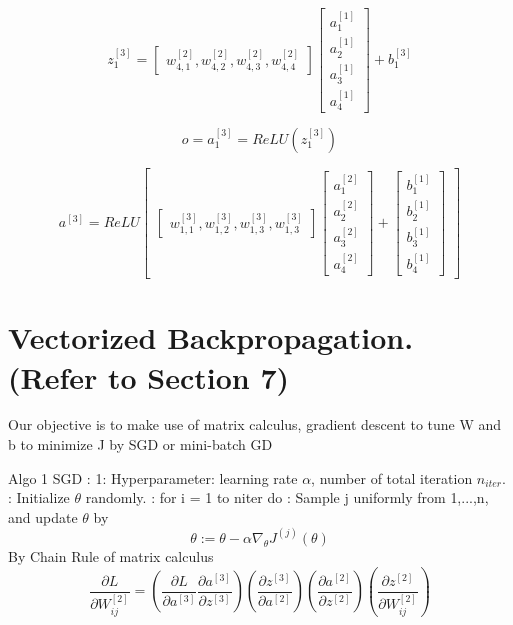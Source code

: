 \documentclass{article}
\begin{document}
\[
z_1^{[3]}=
\begin{bmatrix}
w_{4,1}^{[2]},w_{4,2}^{[2]},w_{4,3}^{[2]},w_{4,4}^{[2]}
\end{bmatrix}
\begin{bmatrix}
a_1^{[1]} \\ a_2^{[1]} \\ a_3^{[1]} \\ a_4^{[1]}
\end{bmatrix}
+ b_1^{[3]}
\]

\[ o = a_1^{[3]} = ReLU( z_1^{[3]}) \]

\[a^{[3]} = ReLU 
\begin{bmatrix}
\begin{bmatrix}
w_{1,1}^{[3]},w_{1,2}^{[3]},w_{1,3}^{[3]},w_{1,3}^{[3]}
\end{bmatrix}
\begin{bmatrix}
a_1^{[2]} \\ a_2^{[2]} \\ a_3^{[2]} \\ a_4^{[2]}
\end{bmatrix} +
\begin{bmatrix}
b_1^{[1]} \\ b_2^{[1]} \\ b_3^{[1]} \\ b_4^{[1]}
\end{bmatrix} 
\end{bmatrix}
\]




\section{Vectorized Backpropagation. (Refer to Section 7)}
Our objective is to make use of matrix calculus, gradient descent to tune W and b to minimize J by SGD or mini-batch GD \newline

Algo 1 SGD : 
 1: Hyperparameter: learning rate \(\alpha\), number of total iteration \(n_{iter}\). : Initialize \(\theta\) randomly. : for i = 1 to niter do : Sample j uniformly from {1,...,n}, and update \(\theta\) by \newline
\[ \theta := \theta - \alpha \nabla_\theta J^{(j)}(\theta) \] 
By Chain Rule of matrix calculus 
\[
\frac{\partial L }{\partial W_{ij}^{[2]}} = ( \frac{\partial L }{\partial a^{[3]}} \frac{\partial a^{[3]}}{\partial z^{[3]}} )
(\frac{\partial z^{[3]}}{\partial a^{[2]}}) ( \frac{\partial a^{[2]}}{\partial z^{[2]}})( \frac{\partial z^{[2]}}{\partial W_{ij}^{[2]}})
\]
\end{document}
